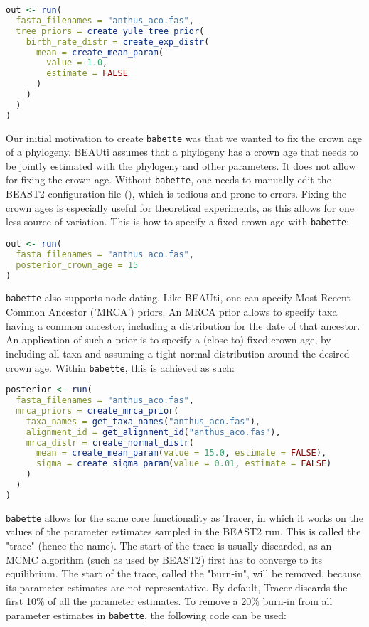 \documentclass{article}
\begin{document}
\begin{lstlisting}[language=R, floatplacement=H]
out <- run(
  fasta_filenames = "anthus_aco.fas",
  tree_priors = create_yule_tree_prior(
    birth_rate_distr = create_exp_distr(
      mean = create_mean_param(
        value = 1.0, 
        estimate = FALSE
      )
    )    
  )
)
\end{lstlisting}

Our initial motivation to create \verb;babette; 
was that we wanted to fix the crown age of a phylogeny.
BEAUti assumes that a phylogeny has a crown age that needs to be 
jointly estimated with the phylogeny and other parameters. 
It does not allow for fixing
the crown age. Without \verb;babette;, one needs to manually edit the BEAST2 
configuration file (\cite{fix_starting_tree}), which is tedious and prone to errors. 
Fixing the crown ages is especially useful for theoretical experiments,
as this allows for one less source of variation.
This is how to specify a fixed crown age with \verb;babette;:

\begin{lstlisting}[language=R, floatplacement=H]
out <- run(
  fasta_filenames = "anthus_aco.fas",
  posterior_crown_age = 15
)
\end{lstlisting}

\verb;babette; also supports node dating. Like BEAUti, one
can specify Most Recent Common Ancestor ('MRCA') priors.
An MRCA prior allows to specify taxa having a common ancestor,
including a distribution for the date of that ancestor.
An application of such a prior is to specify a (close to) fixed
crown age, by including all taxa and assuming a tight 
normal distribution around the desired crown age. 
Within \verb;babette;, this is achieved as such:

\begin{lstlisting}[language=R, floatplacement=H]
posterior <- run(
  fasta_filenames = "anthus_aco.fas",
  mrca_priors = create_mrca_prior(
    taxa_names = get_taxa_names("anthus_aco.fas"),
    alignment_id = get_alignment_id("anthus_aco.fas"),
    mrca_distr = create_normal_distr(
      mean = create_mean_param(value = 15.0, estimate = FALSE),
      sigma = create_sigma_param(value = 0.01, estimate = FALSE)
    )
  )
)
\end{lstlisting}

\verb;babette; allows for the same core functionality as Tracer,
in which it works on the values of the parameter estimates sampled
in the BEAST2 run. This is called the "trace" (hence the name).
The start of the trace is usually discarded, as an MCMC 
algorithm (such as used by BEAST2) first has to converge to
its equilibrium. The start of the trace, called the "burn-in", 
will be removed, because its parameter estimates are not 
representative. By default, Tracer discards the first 10\% of all 
the parameter estimates. 
To remove a 20\% burn-in from all parameter estimates 
in \verb;babette;, the following code can be used:
\end{document}
